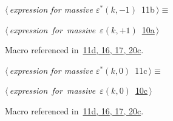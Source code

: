 \documentclass[a4paper,12pt]{amsart}
\renewcommand{\NWtarget}[2]{\hypertarget{#1}{#2}}
\renewcommand{\NWlink}[2]{\hyperlink{#1}{#2}}
\renewcommand{\NWtxtMacroRefIn}{Macro referenced in}
\renewcommand{\NWsep}{${\diamond}$}
\begin{document}
\begin{flushleft} \small
\begin{minipage}{\linewidth}\label{scrap28}\raggedright\small
\NWtarget{nuweb11b}{} $\langle\,${\itshape expression for massive $\varepsilon^\ast(k, -1)$}\nobreak\ {\footnotesize {11b}}$\,\rangle\equiv$
\vspace{-1ex}
\begin{list}{}{} \item
\mbox{}\verb@@\hbox{$\langle\,${\itshape expression for massive $\varepsilon(k, +1)$}\nobreak\ {\footnotesize \NWlink{nuweb10a}{10a}}$\,\rangle$}\verb@@{\NWsep}
\end{list}
\vspace{-1.5ex}
\footnotesize
\begin{list}{}{\setlength{\itemsep}{-\parsep}\setlength{\itemindent}{-\leftmargin}}
\item \NWtxtMacroRefIn\ \NWlink{nuweb11d}{11d}\NWlink{nuweb16}{, 16}\NWlink{nuweb17}{, 17}\NWlink{nuweb20c}{, 20c}.

\item{}
\end{list}
\end{minipage}\vspace{4ex}
\end{flushleft}
\begin{flushleft} \small
\begin{minipage}{\linewidth}\label{scrap29}\raggedright\small
\NWtarget{nuweb11c}{} $\langle\,${\itshape expression for massive $\varepsilon^\ast(k, 0)$}\nobreak\ {\footnotesize {11c}}$\,\rangle\equiv$
\vspace{-1ex}
\begin{list}{}{} \item
\mbox{}\verb@@\hbox{$\langle\,${\itshape expression for massive $\varepsilon(k, 0)$}\nobreak\ {\footnotesize \NWlink{nuweb10c}{10c}}$\,\rangle$}\verb@@{\NWsep}
\end{list}
\vspace{-1.5ex}
\footnotesize
\begin{list}{}{\setlength{\itemsep}{-\parsep}\setlength{\itemindent}{-\leftmargin}}
\item \NWtxtMacroRefIn\ \NWlink{nuweb11d}{11d}\NWlink{nuweb16}{, 16}\NWlink{nuweb17}{, 17}\NWlink{nuweb20c}{, 20c}.

\item{}
\end{list}
\end{minipage}\vspace{4ex}
\end{flushleft}
\end{document}
